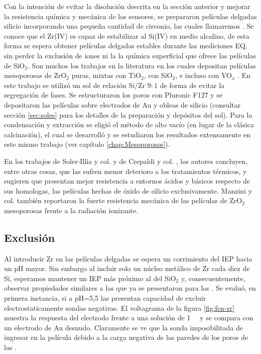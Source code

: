 			Con la intención de evitar la disolución descrita en la sección anterior y mejorar la resistencia química y mecánica de los sensores, se prepararon películas delgadas silicio incorporando una pequeña cantidad de circonio, las cuales llamaremos \pdmZ. Se conoce que el Zr(IV) es capaz de estabilizar al Si(IV) en medio alcalino\cite{Soler-Illia2004}, de esta forma se espera obtener películas delgadas estables durante las mediciones EQ, sin perder la exclusión de iones ni la la química superficial que ofrece las películas de SiO$_2$. Son muchos los trabajos en la literatura en los cuales depositan películas mesoporosas de ZrO$_2$ puras, mixtas con TiO$_2$, con SiO$_2$, e incluso con VO$_x$ \cite{Soler-Illia2004,Crepaldi2002a,Gimenez2016,Zelcer2013,Calvo20210,Angelome2008}. En este trabajo se utilizó un sol de relación Si/Zr $9\!:\!1$ de forma de evitar la segregación de fases\cite{Soler-Illia2004}. Se estructuraron los poros con Pluronic F127 y se depositaron las películas sobre electrodos de Au y obleas de silicio (consultar sección \ref{sec:soles} para los detalles de la preparación y depósitos del sol). Para la condensación y extracción se eligió el método de alto vacío (en lugar de la clásica calcinación), el cual se desarrolló y se estudiaron los resultados extensamente en este mismo trabajo (ver capítulo \ref{chap:Mesoporosos}).

			En los trabajos de Soler-Illia y col.\cite{Soler-Illia2004} y de Crepaldi y col. \cite{Crepaldi2002a}, los autores concluyen, entre otras cosas, que las \pdmZ\space sufren menor deterioro a los tratamientos térmicos, y sugieren que presentan mejor resistencia a entornos ácidos y básicos respecto de sus homologas, las películas hechas de óxido de silicio exclusivamente. Manzini y col.\cite{Gimenez2016} también reportaron la fuerte resistencia mecánica de las películas de ZrO$_2$ mesoporosas frente a la radiación ionizante.

	 \subsection{Exclusión}

	 	 Al introducir Zr en las películas delgadas se espera un corrimiento del IEP hacia un pH mayor\cite{Kosmulski2014}. Sin embargo al incluir solo un núcleo metálico de Zr cada diez de Si, esperamos mantener un IEP más próximo al del SiO$_2$ y, consecuentemente, observar propiedades similares a las que ya se presentaron para las \pdmF.
	 	 Se evaluó, en primera instancia, si a pH=5,5 las \pdmZ\space presentan capacidad de excluir electrostaticamente sondas negativas. El voltagrama de la figura \ref{fig:fcn-zr} muestra la respuesta del electrodo frente a una solución de \fe\space \SI{1}{\milli\Molar} y se compara con un electrodo de Au desnudo. Claramente se ve que la sonda imposibilitada de ingresar en la película debido a la carga negativa de las paredes de los poros de las \pdmZ. 
				
